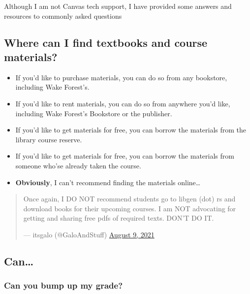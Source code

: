 \documentclass[
]{book}
\providecommand{\tightlist}{%
  \setlength{\itemsep}{0pt}\setlength{\parskip}{0pt}}
\begin{document}
Although I am not Canvas tech support, I have provided some answers and resources to commonly asked questions

\hypertarget{where-can-i-find-textbooks-and-course-materials}{%
\subsection{Where can I find textbooks and course materials?}\label{where-can-i-find-textbooks-and-course-materials}}

\begin{itemize}
\tightlist
\item
  If you'd like to purchase materials, you can do so from any bookstore, including Wake Forest's.
\item
  If you'd like to rent materials, you can do so from anywhere you'd like, including Wake Forest's Bookstore or the publisher.
\item
  If you'd like to get materials for free, you can borrow the materials from the library course reserve.
\item
  If you'd like to get materials for free, you can borrow the materials from someone who'se already taken the course.
\item
  \textbf{Obviously}, I can't recommend finding the materials online\ldots{}
\end{itemize}

\begin{quote}
Once again, I DO NOT recommend students go to libgen (dot) rs and
download books for their upcoming courses. I am NOT advocating for
getting and sharing free pdfs of required texts. DON'T DO IT.

--- itsgalo (@GaloAndStuff) \href{https://twitter.com/GaloAndStuff/status/1424818560417902604}{August 9,
2021}
\end{quote}

\hypertarget{can}{%
\subsection{Can\ldots{}}\label{can}}

\hypertarget{can-you-bump-up-my-grade}{%
\subsubsection{Can you bump up my grade?}\label{can-you-bump-up-my-grade}}
\end{document}
